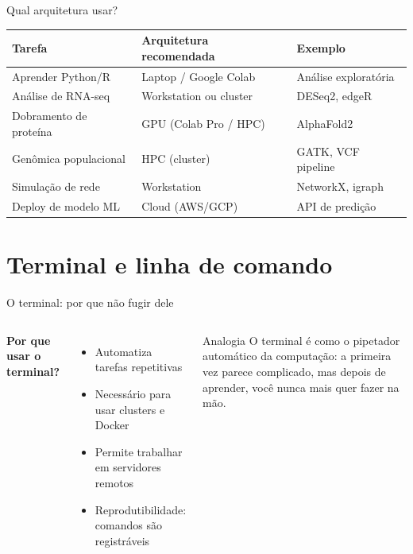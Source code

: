 \begin{frame}{Qual arquitetura usar?}
\begin{center}
\begin{tabular}{lll}
\toprule
\textbf{Tarefa} & \textbf{Arquitetura recomendada} & \textbf{Exemplo} \\
\midrule
Aprender Python/R & Laptop / Google Colab & Análise exploratória \\
Análise de RNA-seq & Workstation ou cluster & DESeq2, edgeR \\
Dobramento de proteína & GPU (Colab Pro / HPC) & AlphaFold2 \\
Genômica populacional & HPC (cluster) & GATK, VCF pipeline \\
Simulação de rede & Workstation & NetworkX, igraph \\
Deploy de modelo ML & Cloud (AWS/GCP) & API de predição \\
\bottomrule
\end{tabular}
\end{center}

\vspace{0.2cm}
\end{frame}

\section{Terminal e linha de comando}

\begin{frame}[fragile]{O terminal: por que não fugir dele}

\vspace{0.3cm}

\begin{columns}
\textbf{Por que usar o terminal?}
\begin{itemize}
    \item Automatiza tarefas repetitivas
    \item Necessário para usar clusters e Docker
    \item Permite trabalhar em servidores remotos
    \item Reprodutibilidade: comandos são registráveis
\end{itemize}

\begin{exampleblock}{Analogia}
O terminal é como o pipetador automático da computação: a primeira vez parece complicado, mas depois de aprender, você nunca mais quer fazer na mão.
\end{exampleblock}
\end{columns}
\end{frame}

